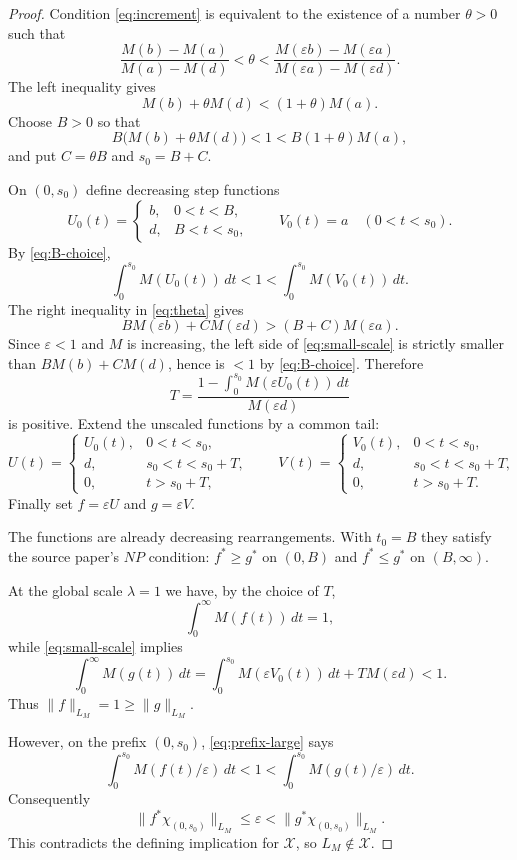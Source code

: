 \documentclass[11pt]{article}
\newcommand{\Xclass}{\mathcal X}
\begin{document}
\begin{proof}
Condition \eqref{eq:increment} is equivalent to the existence of a number
$\theta>0$ such that
\[
 \frac{M(b)-M(a)}{M(a)-M(d)}
 < \theta <
 \frac{M(\varepsilon b)-M(\varepsilon a)}
      {M(\varepsilon a)-M(\varepsilon d)} .
\tag{2}
\label{eq:theta}
\]
The left inequality gives
\[
 M(b)+\theta M(d)<(1+\theta)M(a).
\tag{3}
\label{eq:large-scale}
\]
Choose $B>0$ so that
\[
 B\bigl(M(b)+\theta M(d)\bigr)<1
 <B(1+\theta)M(a),
\tag{4}
\label{eq:B-choice}
\]
and put $C=\theta B$ and $s_0=B+C$.

On $(0,s_0)$ define decreasing step functions
\[
 U_0(t)=
 \begin{cases}
 b,&0<t<B,\\
 d,&B<t<s_0,
 \end{cases}
 \qquad
 V_0(t)=a\quad(0<t<s_0).
\]
By \eqref{eq:B-choice},
\[
 \int_0^{s_0}M(U_0(t))\,dt<1<
 \int_0^{s_0}M(V_0(t))\,dt.
\tag{5}
\label{eq:prefix-large}
\]
The right inequality in \eqref{eq:theta} gives
\[
 B M(\varepsilon b)+C M(\varepsilon d)
 >(B+C)M(\varepsilon a).
\tag{6}
\label{eq:small-scale}
\]
Since $\varepsilon<1$ and $M$ is increasing, the left side of
\eqref{eq:small-scale} is strictly smaller than
$B M(b)+C M(d)$, hence is $<1$ by \eqref{eq:B-choice}. Therefore
\[
 T=\frac{1-\int_0^{s_0}M(\varepsilon U_0(t))\,dt}{M(\varepsilon d)}
\]
is positive. Extend the unscaled functions by a common tail:
\[
 U(t)=
 \begin{cases}
 U_0(t),&0<t<s_0,\\
 d,&s_0<t<s_0+T,\\
 0,&t>s_0+T,
 \end{cases}
 \qquad
 V(t)=
 \begin{cases}
 V_0(t),&0<t<s_0,\\
 d,&s_0<t<s_0+T,\\
 0,&t>s_0+T.
 \end{cases}
\]
Finally set $f=\varepsilon U$ and $g=\varepsilon V$.

The functions are already decreasing rearrangements. With $t_0=B$ they satisfy
the source paper's $NP$ condition: $f^*\ge g^*$ on $(0,B)$ and
$f^*\le g^*$ on $(B,\infty)$.

At the global scale $\lambda=1$ we have, by the choice of $T$,
\[
 \int_0^\infty M(f(t))\,dt=1,
\]
while \eqref{eq:small-scale} implies
\[
 \int_0^\infty M(g(t))\,dt
 =
 \int_0^{s_0}M(\varepsilon V_0(t))\,dt+T M(\varepsilon d)
 <1.
\]
Thus $\|f\|_{L_M}=1\ge \|g\|_{L_M}$.

However, on the prefix $(0,s_0)$, \eqref{eq:prefix-large} says
\[
 \int_0^{s_0}M(f(t)/\varepsilon)\,dt<1
 <
 \int_0^{s_0}M(g(t)/\varepsilon)\,dt.
\]
Consequently
\[
 \|f^*\chi_{(0,s_0)}\|_{L_M}\le \varepsilon
 < \|g^*\chi_{(0,s_0)}\|_{L_M}.
\]
This contradicts the defining implication for $\Xclass$, so
$L_M\notin \Xclass$.
\end{proof}
\end{document}
